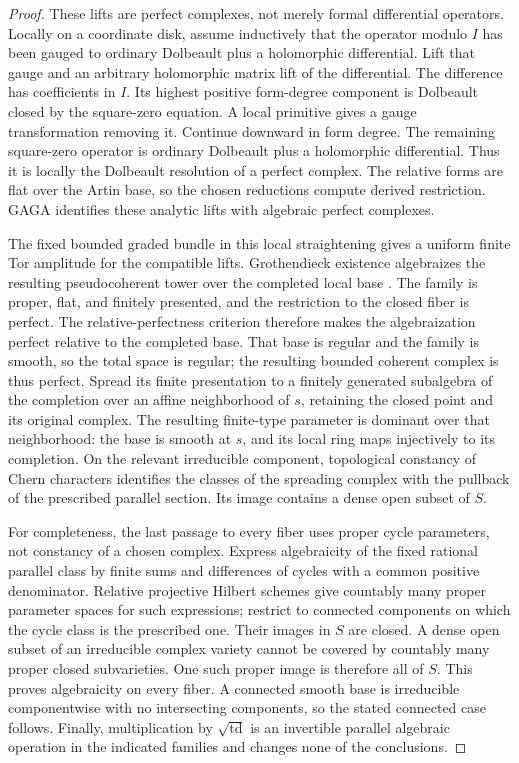 \documentclass[11pt]{article}
\numberwithin{equation}{section}
\theoremstyle{definition}
\theoremstyle{remark}
\DeclareMathOperator{\td}{td}
\begin{document}
\begin{proof}
These lifts are perfect complexes, not merely formal differential
operators.  Locally on a coordinate disk, assume inductively that the
operator modulo \(I\) has been gauged to ordinary Dolbeault plus a
holomorphic differential.  Lift that gauge and an arbitrary
holomorphic matrix lift of the differential.  The difference has
coefficients in \(I\).  Its highest positive form-degree component is
Dolbeault closed by the square-zero equation.  A local primitive gives
a gauge transformation removing it.  Continue downward in form
degree.  The remaining square-zero operator is ordinary Dolbeault
plus a holomorphic differential.  Thus it is locally the Dolbeault
resolution of a perfect complex.  The relative forms are flat over
the Artin base, so the chosen reductions compute derived restriction.
GAGA identifies these analytic lifts with algebraic perfect complexes.

The fixed bounded graded bundle in this local straightening gives
a uniform finite Tor amplitude for the compatible lifts.
Grothendieck existence algebraizes the resulting pseudocoherent tower
over the completed local base
\cite[Theorem~38.29.6, Tag~0DIG]{PerfectGrothendieckExistence}.
The family is proper, flat, and finitely presented, and the restriction
to the closed fiber is perfect.  The relative-perfectness criterion
\cite[Lemma~37.71.3, Tag~0DJZ]{PerfectGrothendieckExistence} therefore
makes the algebraization perfect relative to the completed base.
That base is regular and the family is smooth, so the total space is
regular; the resulting bounded coherent complex is thus perfect.
Spread its finite presentation to a finitely generated subalgebra of
the completion over an affine neighborhood of \(s\), retaining the
closed point and its original complex.  The resulting finite-type
parameter is dominant over that neighborhood: the base is smooth at
\(s\), and its local ring maps injectively to its completion.
On the relevant irreducible component, topological constancy of Chern
characters identifies the classes of the spreading complex with the
pullback of the prescribed parallel section.  Its image contains a
dense open subset of \(S\).

For completeness, the last passage to every fiber uses proper cycle
parameters, not constancy of a chosen complex.  Express algebraicity
of the fixed rational parallel class by finite sums and differences
of cycles with a common positive denominator.  Relative projective
Hilbert schemes give countably many proper parameter spaces for such
expressions; restrict to connected components on which the cycle
class is the prescribed one.  Their images in \(S\) are closed.
A dense open subset of an irreducible complex variety cannot be
covered by countably many proper closed subvarieties.  One such
proper image is therefore all of \(S\).  This proves algebraicity on
every fiber.  A connected smooth base is irreducible componentwise
with no intersecting components, so the stated connected case follows.
Finally, multiplication by \(\sqrt{\td}\) is an invertible parallel
algebraic operation in the indicated families and changes none of
the conclusions.
\end{proof}
\end{document}
